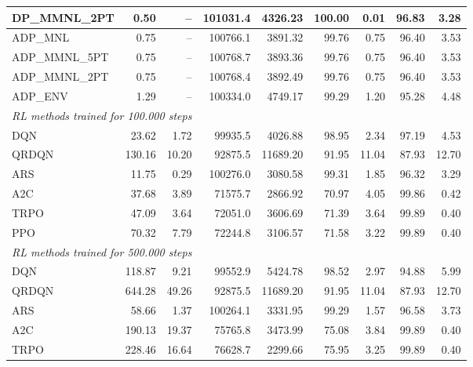 \begin{samepage}
\begin{center}
\begin{tabular}{l|rr|rr|rr|rr}
    DP\_MMNL\_2PT &     0.50 &    -- &   101031.4 &    4326.23 &  100.00 &    0.01 &   96.83 &    3.28 \\
    \midrule
    ADP\_MNL     &     0.75 &    -- &   100766.1 &    3891.32 &   99.76 &    0.75 &   96.40 &    3.53 \\
    ADP\_MMNL\_5PT &     0.75 &    -- &   100768.7 &    3893.36 &   99.76 &    0.75 &   96.40 &    3.53 \\
    ADP\_MMNL\_2PT &     0.75 &    -- &   100768.4 &    3892.49 &   99.76 &    0.75 &   96.40 &    3.53 \\
    ADP\_ENV     &     1.29 &    -- &   100334.0 &    4749.17 &   99.29 &    1.20 &   95.28 &    4.48 \\
    \midrule
    \multicolumn{9}{l}{\textit{RL methods trained for 100.000 steps}} \\
    \midrule
    DQN          &    23.62 &     1.72 &    99935.5 &    4026.88 &   98.95 &    2.34 &   97.19 &    4.53 \\
    QRDQN        &   130.16 &    10.20 &    92875.5 &   11689.20 &   91.95 &   11.04 &   87.93 &   12.70 \\
    ARS          &    11.75 &     0.29 &   100276.0 &    3080.58 &   99.31 &    1.85 &   96.32 &    3.29 \\
    A2C          &    37.68 &     3.89 &    71575.7 &    2866.92 &   70.97 &    4.05 &   99.86 &    0.42 \\
    TRPO         &    47.09 &     3.64 &    72051.0 &    3606.69 &   71.39 &    3.64 &   99.89 &    0.40 \\
    PPO          &    70.32 &     7.79 &    72244.8 &    3106.57 &   71.58 &    3.22 &   99.89 &    0.40 \\
    \midrule
    \multicolumn{9}{l}{\textit{RL methods trained for 500.000 steps}} \\
    \midrule
    DQN          &   118.87 &     9.21 &    99552.9 &    5424.78 &   98.52 &    2.97 &   94.88 &    5.99 \\
    QRDQN        &   644.28 &    49.26 &    92875.5 &   11689.20 &   91.95 &   11.04 &   87.93 &   12.70 \\
    ARS          &    58.66 &     1.37 &   100264.1 &    3331.95 &   99.29 &    1.57 &   96.58 &    3.73 \\
    A2C          &   190.13 &    19.37 &    75765.8 &    3473.99 &   75.08 &    3.84 &   99.89 &    0.40 \\
    TRPO         &   228.46 &    16.64 &    76628.7 &    2299.66 &   75.95 &    3.25 &   99.89 &    0.40 \\

\end{tabular}
\end{center}
\end{samepage}
